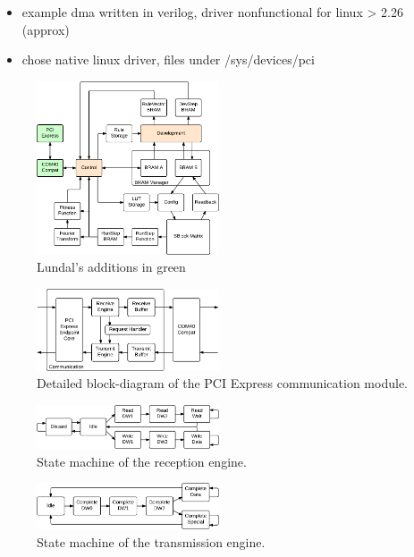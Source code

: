 
\TODO

\begin{itemize}
    \item example dma written in verilog, driver nonfunctional for linux > 2.26 (approx)
    \item chose native linux driver, files under /sys/devices/pci
\end{itemize}

\begin{figure}[!ht]
    \centering
    \includegraphics[width=0.48\textwidth]{figures/overview-lundal}
    \caption{Lundal's additions in green}
    \label{fig:overview-lundal}
\end{figure}

\begin{figure}[!ht]
    \centering
    \includegraphics[width=0.48\textwidth]{figures/details-communication}
    \caption{Detailed block-diagram of the PCI Express communication module.}
    \label{fig:details-communication}
\end{figure}

\begin{figure}[!ht]
    \centering
    \includegraphics[width=0.48\textwidth]{figures/statemachine-receive}
    \caption{State machine of the reception engine.}
    \label{fig:statemachine-receive}
\end{figure}

\begin{figure}[!ht]
    \centering
    \includegraphics[width=0.48\textwidth]{figures/statemachine-transmit}
    \caption{State machine of the transmission engine.}
    \label{fig:statemachine-transmit}
\end{figure}

